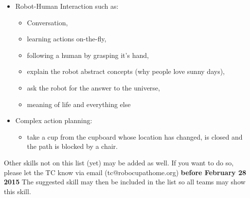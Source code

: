 \begin{itemize}
\begin{itemize}
    \end{itemize}
  \item Robot-Human Interaction such as: 
    \begin{itemize}
      \item Conversation,  
      \item learning actions on-the-fly, 
      \item following a human by grasping it’s hand,
      \item explain the robot abstract concepts (why people love sunny days), 
      \item ask the robot for the answer to the universe, 
      \item meaning of life and everything else
    \end{itemize}
  \item Complex action planning: 
    \begin{itemize}
      \item take a cup from the cupboard whose location has changed, is closed and the path is blocked by a chair.
    \end{itemize}
\end{itemize}

Other skills not on this list (yet) may be added as well. 
If you want to do so, please let the TC know via email (tc@robocupathome.org) \textbf{before February 28 2015}
The suggested skill may then be included in the list so all teams may show this skill. 